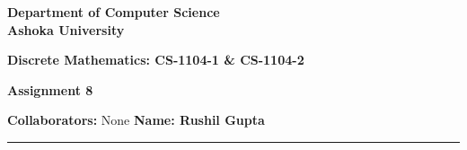 \documentclass[a4paper]{article}
\begin{document}
\begin{center}
{\large \bf \color{red}  Department of Computer Science} \\
{\large \bf \color{red}  Ashoka University} \\

\vspace{0.1in}

{\large \bf \color{blue}  Discrete Mathematics: CS-1104-1 \& CS-1104-2}

\vspace{0.05in}

    { \bf \color{YellowOrange} Assignment 8}
\end{center}
\medskip

{\textbf{Collaborators:} None} \hfill {\textbf{Name: Rushil Gupta} }

\bigskip
\hrule
\end{document}
